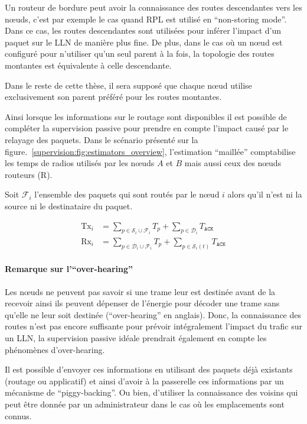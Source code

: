 Un routeur de bordure peut avoir la connaissance des routes descendantes vers les nœuds, c'est par exemple le cas quand \ac{RPL} est utilisé en ``non-storing mode''.
Dans ce cas, les routes descendantes sont utilisées pour inférer l'impact d'un paquet sur le \ac{LLN} de manière plus fine.
De plus, dans le cas où un nœud est configuré pour n'utiliser qu'un seul parent à la fois, la topologie des routes montantes est équivalente à celle descendante.

Dans le reste de cette thèse, il sera supposé que chaque nœud utilise exclusivement son parent préféré pour les routes montantes.


Ainsi lorsque les informations sur le routage sont disponibles il est possible de compléter la supervision passive pour prendre en compte l'impact causé par le relayage des paquets.
Dans le scénario présenté sur la figure.~\ref{supervision:fig:estimators_overview}, l'estimation ``maillée'' comptabilise les temps de radios utilisés par les nœuds $A$ et $B$ mais aussi ceux des nœuds routeurs (R).

Soit $\mathcal{F}_i$ l'ensemble des paquets qui sont routés par le nœud $i$ alors qu'il n'est ni la source ni le destinataire du paquet.

\begin{align}
  \textrm{Tx}_i &= \sum_{p \in \mathcal{S}_i \cup \mathcal{F}_i}{T_p}
                      + \sum_{p \in \mathcal{D}_i}{T_{\texttt{ACK}}}\\
  \textrm{Rx}_i &= \sum_{p \in \mathcal{D}_i \cup \mathcal{F}_i}{T_p}
                      + \sum_{p \in \mathcal{S}_i(t)}{T_{\texttt{ACK}}}
\end{align}

\paragraph{Remarque sur l'``over-hearing''}

Les nœuds ne peuvent pas savoir si une trame leur est destinée avant de la recevoir ainsi ils peuvent dépenser de l'énergie pour décoder une trame sans qu'elle ne leur soit destinée (``over-hearing'' en anglais).
Donc, la connaissance des routes n'est pas encore suffisante pour prévoir intégralement l'impact du trafic sur un \ac{LLN}, la supervision passive idéale prendrait également en compte les phénomènes d'over-hearing.

Il est possible d'envoyer ces informations en utilisant des paquets déjà existants (routage ou applicatif) et ainsi d'avoir à la passerelle ces informations par un mécanisme de ``piggy-backing''.
Ou bien, d'utiliser la connaissance des voisins qui peut être donnée par un administrateur dans le cas où les emplacements sont connus.

